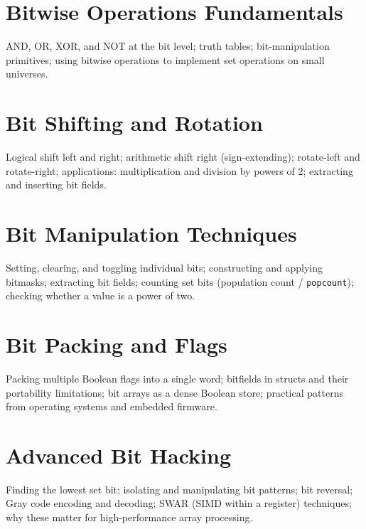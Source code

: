 \chapter{Bitwise Operations Fundamentals}
\label{ch:bitwise-ops}

AND, OR, XOR, and NOT at the bit level; truth tables; bit-manipulation
primitives; using bitwise operations to implement set operations on small
universes.

\chapter{Bit Shifting and Rotation}
\label{ch:bit-shifting}

Logical shift left and right; arithmetic shift right (sign-extending);
rotate-left and rotate-right; applications: multiplication and division by
powers of 2; extracting and inserting bit fields.

\chapter{Bit Manipulation Techniques}
\label{ch:bit-techniques}

Setting, clearing, and toggling individual bits; constructing and applying
bitmasks; extracting bit fields; counting set bits (population count /
\texttt{popcount}); checking whether a value is a power of two.

\chapter{Bit Packing and Flags}
\label{ch:bit-packing}

Packing multiple Boolean flags into a single word; bitfields in structs and
their portability limitations; bit arrays as a dense Boolean store; practical
patterns from operating systems and embedded firmware.

\chapter{Advanced Bit Hacking}
\label{ch:bit-hacking}

Finding the lowest set bit; isolating and manipulating bit patterns; bit
reversal; Gray code encoding and decoding; SWAR (SIMD within a register)
techniques; why these matter for high-performance array processing.



